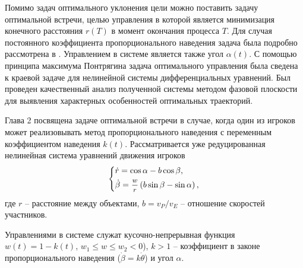 \documentclass[a4paper,12pt, openany]{book}
\theoremstyle{plain} %
\theoremstyle{definition} %
\theoremstyle{remark} %
\numberwithin{equation}{chapter}
\begin{document}
{Помимо задач оптимального уклонения цели можно поставить задачу оптимальной встречи, целью управления в которой является минимизация конечного расстояния $r(T)$ в момент окончания процесса $T$. Для случая постоянного коэффициента пропорционального наведения задача была подробно рассмотрена в \cite{Cherkasov3}. Управлением в системе является также угол $\alpha(t)$. С помощью принципа максимума Понтрягина задача оптимального управления была сведена к краевой задаче для нелинейной системы дифференциальных уравнений. Был проведен качественный анализ полученной системы методом фазовой плоскости для выявления характерных особенностей оптимальных траекторий.


Глава 2 посвящена задаче оптимальной встречи в случае, когда один из игроков может реализовывать метод пропорционального наведения с переменным коэффициентом наведения $k(t)$. Рассматривается уже редуцированная нелинейная система уравнений движения игроков 
$$
\left\{ {\begin{aligned}
   & \dot r = \cos \alpha  - b\cos \beta , \hfill  \\
   & \dot \beta  = \mfrac{w}
{r}\left( {b\sin \beta  - \sin \alpha } \right), \hfill  \\
 \end{aligned} } \right.
$$
где $r$ -- расстояние между объектами,  $b = v_P/v_E$ -- отношение скоростей участников.

Управлениями в системе служат кусочно-непрерывная функция $w(t) = 1-k(t)$, $w_1 \leqslant w \leqslant w_2 < 0$), $k>1$ -- коэффициент в законе пропорционального наведения ($\dot\beta = k\dot\theta$) и угол $\alpha$. 

}
\end{document}
